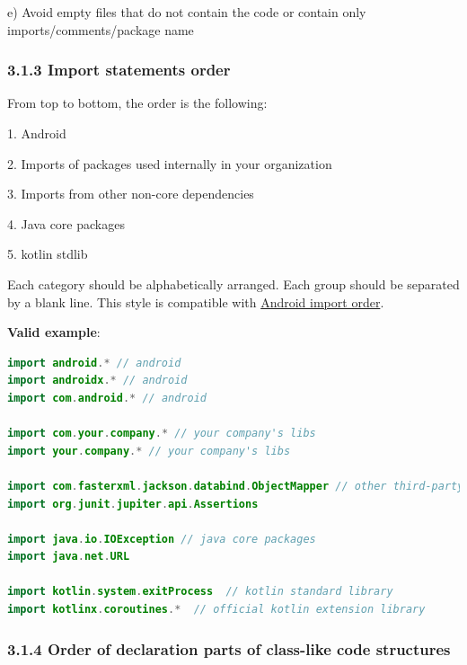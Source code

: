 e) Avoid empty files that do not contain the code or contain only imports/comments/package name



\subsubsection*{\textbf{3.1.3 Import statements order}}
\leavevmode\newline



From top to bottom, the order is the following:

1. Android

2. Imports of packages used internally in your organization

3. Imports from other non-core dependencies

4. Java core packages

5. kotlin stdlib



Each category should be alphabetically arranged. Each group should be separated by a blank line. This style is compatible with  \href{https://source.android.com/setup/contribute/code-style#order-import-statements}{Android import order}.



\textbf{Valid example}:

\begin{lstlisting}[language=Kotlin]
import android.* // android
import androidx.* // android
import com.android.* // android

import com.your.company.* // your company's libs
import your.company.* // your company's libs

import com.fasterxml.jackson.databind.ObjectMapper // other third-party dependencies
import org.junit.jupiter.api.Assertions

import java.io.IOException // java core packages
import java.net.URL

import kotlin.system.exitProcess  // kotlin standard library
import kotlinx.coroutines.*  // official kotlin extension library
\end{lstlisting}


\subsubsection*{\textbf{3.1.4 Order of declaration parts of class-like code structures}}
\leavevmode\newline

